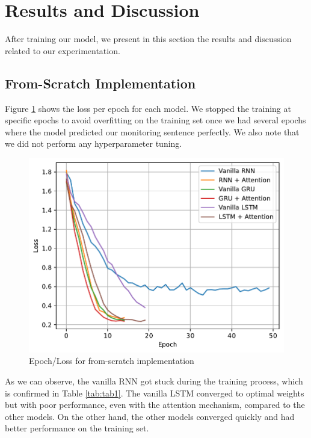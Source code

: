 \section{Results and Discussion}\label{res}
After training our model, we present in this section the results and discussion related to our experimentation.
\subsection{From-Scratch Implementation}
Figure \ref{fig:loss1} shows the loss per epoch for each model. We stopped the training at specific epochs to avoid overfitting on the training set once we had several epochs where the model predicted our monitoring sentence perfectly. We also note that we did not perform any hyperparameter tuning.

\begin{figure}[H]
	\centering
	\includegraphics[width=0.9\linewidth]{./figures/vanilla.pdf}
	\caption{Epoch/Loss for from-scratch implementation}
	\label{fig:loss1}
\end{figure}

As we can observe, the vanilla RNN got stuck during the training process, which is confirmed in Table \ref{tab:tab1}. The vanilla LSTM converged to optimal weights but with poor performance, even with the attention mechanism, compared to the other models. On the other hand, the other models converged quickly and had better performance on the training set.

